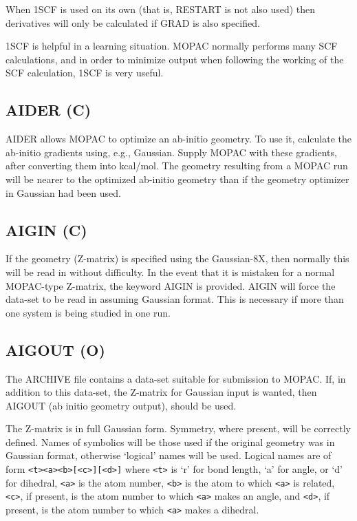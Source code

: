 \documentclass[a4paper]{book}
\newcommand{\mi}[1]{#1\index{#1}}
\begin{document}
      When 1SCF is used on its own (that is, RESTART  is  not  also  used)
 then derivatives will only be calculated if GRAD is also specified.

      1SCF is helpful in a learning situation.   MOPAC  normally  performs
 many SCF calculations, and in order to minimize output when following the
 working of the SCF calculation, 1SCF is very useful.

\subsection*{AIDER (C)}
 \mi{AIDER} allows MOPAC to optimize an ab-initio geometry.   To  use  it,
 calculate  the  ab-initio  gradients using, e.g., Gaussian.  Supply MOPAC
 with these gradients, after converting them into kcal/mol.  The  geometry
 resulting  from  a  MOPAC  run  will be nearer to the optimized ab-initio
 geometry than if the geometry optimizer in Gaussian had been used.
 
 
\subsection*{AIGIN (C)}
      If the geometry (Z-matrix) is specified using the Gaussian-8X,  then
 normally  this  will be read in without difficulty.  In the event that it
 is mistaken for a  normal  MOPAC-type  Z-matrix,  the  keyword  AIGIN  is
 provided. \mi{AIGIN} will force the data-set to be read in assuming Gaussian
 format.  This is necessary if more than one system is  being  studied  in
 one run.

\subsection*{AIGOUT (O)}
     The ARCHIVE file contains a  data-set  suitable  for  submission  to
MOPAC.  If, in addition to this data-set, the Z-matrix for Gaussian input
is wanted, then \mi{AIGOUT} (ab initio geometry output), should be used.

     The Z-matrix is in full Gaussian  form.   Symmetry,  where  present,
will  be correctly defined.  Names of symbolics will be those used if the
original geometry was in Gaussian format, otherwise `logical' names  will
be  used.  Logical names are of form \verb/<t><a><b>[<c>][<d>]/ 
where \verb/<t>/ is `r'
for bond length, `a' for angle, or `d' for  dihedral, \verb/<a>/ is the atom
number, \verb/<b>/ is the atom to which \verb/<a>/ is related, \verb/<c>/, 
if present, is the atom number to which \verb/<a>/ makes an angle, 
and \verb/<d>/, if present, is the atom
number to which \verb/<a>/ makes a dihedral.
\end{document}

